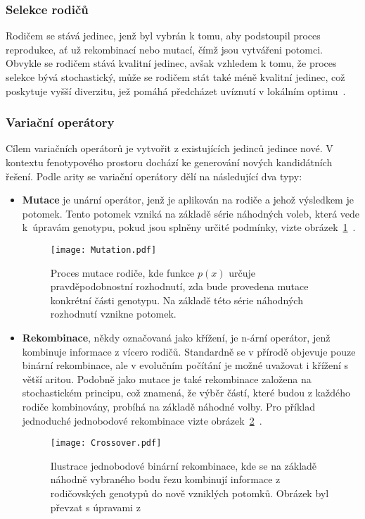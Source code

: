 \subsubsection*{Selekce rodičů}
Rodičem se stává jedinec, jenž byl vybrán k tomu, aby podstoupil proces reprodukce, ať už rekombinací nebo mutací, čímž jsou vytvářeni potomci. 
Obvykle se rodičem stává kvalitní jedinec, avšak vzhledem k tomu, že proces selekce bývá stochastický, může se rodičem stát také méně kvalitní jedinec, což poskytuje vyšší diverzitu, jež pomáhá předcházet uvíznutí v lokálním optimu~\cite{IntroductionToEvoComputing}. 

\subsubsection*{Variační operátory}
Cílem variačních operátorů je vytvořit z existujících jedinců jedince nové. 
V kontextu fenotypového prostoru dochází ke generování nových kandidátních řešení. 
Podle arity se variační operátory dělí na následující dva typy:
\begin{itemize}
    \item \textbf{Mutace} je unární operátor, jenž je aplikován na rodiče a jehož výsledkem je potomek. 
        Tento potomek vzniká na základě série náhodných voleb, která vede k~úpravám genotypu, pokud jsou splněny určité podmínky, vizte obrázek~\ref{fig:mutation}~\cite{IntroductionToEvoComputing,NaturalComputing}. 
        \begin{figure}[ht!]
            \centering
            \texttt{[image: Mutation.pdf]}
            \caption{Proces mutace rodiče, kde funkce $p\left(x\right)$ určuje pravděpodobnostní rozhodnutí, zda bude provedena mutace konkrétní části genotypu. Na základě této série náhodných rozhodnutí vznikne potomek.}
            \label{fig:mutation}
        \end{figure}
    \item \textbf{Rekombinace}, někdy označovaná jako křížení, je n-ární operátor, jenž kombinuje informace z vícero rodičů. 
        Standardně se v přírodě objevuje pouze binární rekombinace, ale v evolučním počítání je možné uvažovat i křížení s větší aritou. 
        Podobně jako mutace je také rekombinace založena na stochastickém principu, což znamená, že výběr částí, které budou z každého rodiče kombinovány, probíhá na základě náhodné volby. 
        Pro příklad jednoduché jednobodové rekombinace vizte obrázek~\ref{fig:crossover}~\cite{IntroductionToEvoComputing}. 
        \begin{figure}[ht!]
            \centering
            \texttt{[image: Crossover.pdf]}
            \caption{Ilustrace jednobodové binární rekombinace, kde se na základě náhodně vybraného bodu řezu kombinují informace z rodičovských genotypů do nově vzniklých potomků. Obrázek byl převzat s úpravami z~\cite{NaturalComputing}}
            \label{fig:crossover}
        \end{figure}
\end{itemize}
